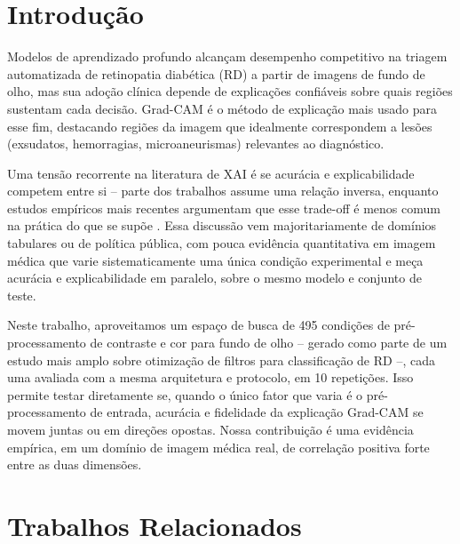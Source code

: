\documentclass[12pt]{article}
\begin{document}
\section{Introdução}

Modelos de aprendizado profundo alcançam desempenho competitivo na triagem
automatizada de retinopatia diabética (RD) a partir de imagens de fundo de
olho, mas sua adoção clínica depende de explicações confiáveis sobre quais
regiões sustentam cada decisão. Grad-CAM \cite{selvaraju2017gradcam} é o
método de explicação mais usado para esse fim, destacando regiões da imagem
que idealmente correspondem a lesões (exsudatos, hemorragias,
microaneurismas) relevantes ao diagnóstico.

Uma tensão recorrente na literatura de XAI é se acurácia e explicabilidade
competem entre si -- parte dos trabalhos assume uma relação inversa,
enquanto estudos empíricos mais recentes argumentam que esse trade-off é
menos comum na prática do que se supõe \cite{bell2022justnotsimple}. Essa
discussão vem majoritariamente de domínios tabulares ou de política pública,
com pouca evidência quantitativa em imagem médica que varie sistematicamente
uma única condição experimental e meça acurácia e explicabilidade em
paralelo, sobre o mesmo modelo e conjunto de teste.

Neste trabalho, aproveitamos um espaço de busca de 495 condições de
pré-processamento de contraste e cor para fundo de olho -- gerado como parte
de um estudo mais amplo sobre otimização de filtros para classificação de RD
--, cada uma avaliada com a mesma arquitetura e protocolo, em 10 repetições.
Isso permite testar diretamente se, quando o único fator que varia é o
pré-processamento de entrada, acurácia e fidelidade da explicação Grad-CAM
se movem juntas ou em direções opostas. Nossa contribuição é uma evidência
empírica, em um domínio de imagem médica real, de correlação positiva forte
entre as duas dimensões.

\section{Trabalhos Relacionados}
\end{document}

